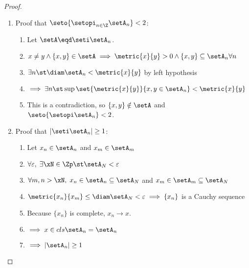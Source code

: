 \begin{proof}
\begin{enumerate}
\item Proof that $\seto{\setopi_{n\in\Z} \setA_n}<2$:
  \begin{enumerate}
    \item Let $\setA\eqd\seti \setA_n$.
    \item $x\ne y \land \{x,y\}\in \setA \implies \metric{x}{y}>0 \land \{x,y\}\subseteq \setA_n \forall n$
    \item $\exists n \st \diam \setA_n < \metric{x}{y}$ by left hypothesis
    \item $\implies \exists n \st \sup\set{\metric{x}{y}}{x,y\in \setA_n}<\metric{x}{y}$
    \item This is a contradiction, so $\{x,y\}\notin \setA$ and $\seto{\setopi \setA_n}<2$.
  \end{enumerate}

\item Proof that $|\seti \setA_n|\ge1$:
  \begin{enumerate}
    \item Let $x_n\in \setA_n$ and $x_m\in \setA_m$
    \item $\forall \varepsilon,\; \exists\xN\in\Zp \st \setA_N < \varepsilon$
    \item $\forall m,n>\xN,\; x_n\in \setA_n\subseteq \setA_N$ and $x_m\in \setA_m\subseteq \setA_N$
    \item $\metric{x_n}{x_m}\le\diam \setA_N < \varepsilon \implies \{x_n\}$ is a Cauchy sequence
    \item Because $\{x_n\}$ is complete, $x_n\to x$.
    \item $\implies x\in cls\setA_n = \setA_n$
    \item $\implies |\setA_n|\ge1$
  \end{enumerate}
\end{enumerate}
\end{proof}






